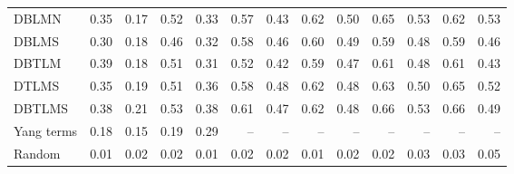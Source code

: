 \begin{tabular}{@{}lrrrrrrrrrrrr@{}}
DBLMN & 0.35 & 0.17 & 0.52 & 0.33 & 0.57 & 0.43 & 0.62 & 0.50 & 0.65 & 0.53 & 0.62 & 0.53 \\
DBLMS & 0.30 & 0.18 & 0.46 & 0.32 & 0.58 & 0.46 & 0.60 & 0.49 & 0.59 & 0.48 & 0.59 & 0.46 \\
DBTLM & 0.39 & 0.18 & 0.51 & 0.31 & 0.52 & 0.42 & 0.59 & 0.47 & 0.61 & 0.48 & 0.61 & 0.43 \\
DTLMS & 0.35 & 0.19 & 0.51 & 0.36 & 0.58 & 0.48 & 0.62 & 0.48 & 0.63 & 0.50 & 0.65 & 0.52 \\
DBTLMS & 0.38 & 0.21 & 0.53 & 0.38 & 0.61 & 0.47 & 0.62 & 0.48 & 0.66 & 0.53 & 0.66 & 0.49 \\
\midrule
Yang terms & 0.18 & 0.15 & 0.19 & 0.29 & -- & -- & -- & -- & -- & -- & -- & -- \\
Random & 0.01 & 0.02 & 0.02 & 0.01 & 0.02 & 0.02 & 0.01 & 0.02 & 0.02 & 0.03 & 0.03 & 0.05 \\
\bottomrule
\end{tabular}
